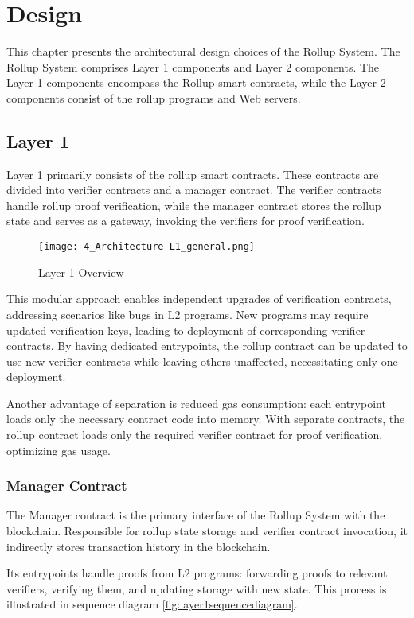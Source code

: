 \chapter{Design\label{cha:chapter4}}
This chapter presents the architectural design choices of the Rollup System. The Rollup System comprises Layer 1 components and Layer 2 components. The Layer 1 components encompass the Rollup smart contracts, while the Layer 2 components consist of the rollup programs and Web servers.

\section{Layer 1\label{sec:designlayer1}}
Layer 1 primarily consists of the rollup smart contracts. These contracts are divided into verifier contracts and a manager contract. The verifier contracts handle rollup proof verification, while the manager contract stores the rollup state and serves as a gateway, invoking the verifiers for proof verification.

\begin{figure}[htb]
  \centering
  \texttt{[image: 4\_Architecture-L1\_general.png]}
  \caption{Layer 1 Overview}
  \label{fig:layer1overview}
\end{figure}

This modular approach enables independent upgrades of verification contracts, addressing scenarios like bugs in L2 programs. New programs may require updated verification keys, leading to deployment of corresponding verifier contracts. By having dedicated entrypoints, the rollup contract can be updated to use new verifier contracts while leaving others unaffected, necessitating only one deployment.

Another advantage of separation is reduced gas consumption: each entrypoint loads only the necessary contract code into memory. With separate contracts, the rollup contract loads only the required verifier contract for proof verification, optimizing gas usage.

\subsection{Manager Contract\label{sec:designrollupcontract}}
The Manager contract is the primary interface of the Rollup System with the blockchain. Responsible for rollup state storage and verifier contract invocation, it indirectly stores transaction history in the blockchain.

Its entrypoints handle proofs from L2 programs: forwarding proofs to relevant verifiers, verifying them, and updating storage with new state. This process is illustrated in sequence diagram \ref{fig:layer1sequencediagram}.

